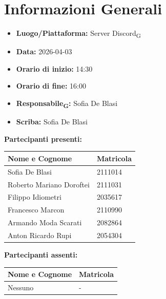 \section{Informazioni Generali}
\begin{itemize}
	\item \textbf{Luogo/Piattaforma:} Server Discord\textsubscript{G}
	\item \textbf{Data:} 2026-04-03
	\item \textbf{Orario di inizio:} 14:30
	\item \textbf{Orario di fine:} 16:00
	\item \textbf{Responsabile\textsubscript{G}:} Sofia De Blasi
	\item \textbf{Scriba:} Sofia De Blasi
\end{itemize}

\vspace{0.5cm}
\textbf{Partecipanti presenti:}
\begin{table}[ht]
	\centering
	\renewcommand{\arraystretch}{1.2}
	\begin{tabularx}{\textwidth}{X l}
		\toprule
		\textbf{Nome e Cognome} & \textbf{Matricola} \\
		\midrule
		Sofia De Blasi & 2111014 \\
		Roberto Mariano Doroftei & 2111031 \\
		Filippo Idiometri & 2035617 \\
		Francesco Marcon & 2110990 \\
		Armando Moda Scarati & 2082864 \\
		Anton Ricardo Rupi & 2054304 \\
		\bottomrule
	\end{tabularx}
\end{table}

\vspace{0.5cm}
\textbf{Partecipanti assenti:}
\begin{table}[ht]
	\centering
	\renewcommand{\arraystretch}{1.2}
	\begin{tabularx}{\textwidth}{X l}
		\toprule
		\textbf{Nome e Cognome} & \textbf{Matricola} \\
		\midrule
		Nessuno & - \\
		\bottomrule
	\end{tabularx}
\end{table}

